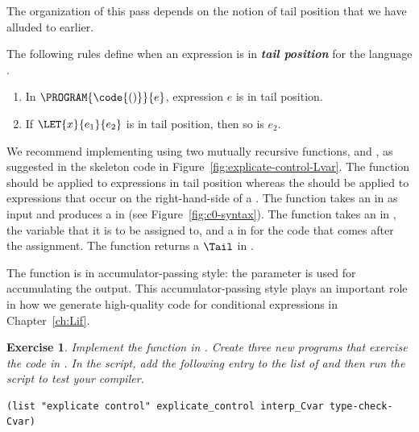 \documentclass[7x10]{TimesAPriori_MIT}%
\newtheorem{exercise}[theorem]{Exercise}
\begin{document}
{The organization of this pass depends on the notion of tail position
that we have alluded to earlier.

\begin{definition}
  The following rules define when an expression is in \textbf{\emph{tail
  position}} for the language \LangVar{}.
\begin{enumerate}
\item In $\PROGRAM{\code{()}}{e}$, expression $e$ is in tail position.
\item If $\LET{x}{e_1}{e_2}$ is in tail position, then so is $e_2$.
\end{enumerate}
\end{definition}

We recommend implementing  using two mutually
recursive functions,  and
, as suggested in the skeleton code in
Figure~\ref{fig:explicate-control-Lvar}.  The 
function should be applied to expressions in tail position whereas the
 should be applied to expressions that occur on
the right-hand-side of a .
%
The  function takes an \Exp{} in \LangVar{} as
input and produces a \Tail{} in \LangCVar{} (see
Figure~\ref{fig:c0-syntax}).
%
The  function takes an \Exp{} in \LangVar{},
the variable that it is to be assigned to, and a \Tail{} in
\LangCVar{} for the code that comes after the assignment.  The
 function returns a $\Tail$ in \LangCVar{}.

The  function is in accumulator-passing style:
the  parameter is used for accumulating the output. This
accumulator-passing style plays an important role in how we generate
high-quality code for conditional expressions in Chapter~\ref{ch:Lif}.

\begin{exercise}\normalfont
%
Implement the  function in
.  Create three new \LangInt{} programs that
exercise the code in .
%
In the  script, add the following entry to the
list of  and then run the script to test your compiler.
\begin{lstlisting}
(list "explicate control" explicate_control interp_Cvar type-check-Cvar)  
\end{lstlisting}
\end{exercise}
\fi}
\end{document}
